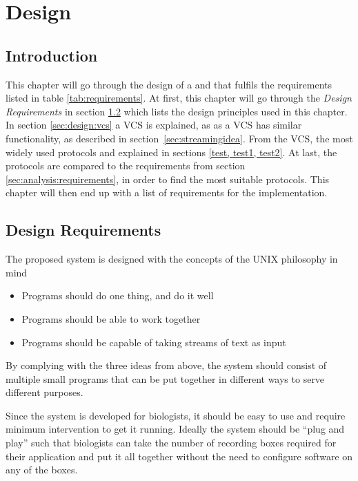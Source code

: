 \chapter{Design} \label{chp:design}

\section{Introduction}
This chapter will go through the design of a  and  that fulfils the requirements listed in table \ref{tab:requirements}.
At first, this chapter will go through the \textit{Design Requirements} in section \ref{sec:design:requirements} which lists the design principles used in this chapter.
In section \ref{sec:design:vcs} a \ac{VCS} is explained, as as a \ac{VCS} has similar functionality, as described in section~\ref{sec:streamingidea}.
From the \ac{VCS}, the most widely used protocols and explained in sections \cref{test, test1, test2}.
At last, the protocols are compared to the requirements from section \ref{sec:analysis:requirements}, in order to find the most suitable protocols.
This chapter will then end up with a list of requirements for the implementation.

\section{Design Requirements} \label{sec:design:requirements}
The proposed system is designed with the concepts of the UNIX philosophy in mind
\begin{itemize}
	\item Programs should do one thing, and do it well
	\item Programs should be able to work together
	\item Programs should be capable of taking streams of text as input
\end{itemize}


By complying with the three ideas from above, the system should consist of multiple small programs that can be put together in different ways to serve different purposes.

Since the system is developed for biologists, it should be easy to use and require minimum intervention to get it running. Ideally the system should be “plug and play” such that biologists can take the number of recording boxes required for their application and put it all together without the need to configure software on any of the boxes. 

